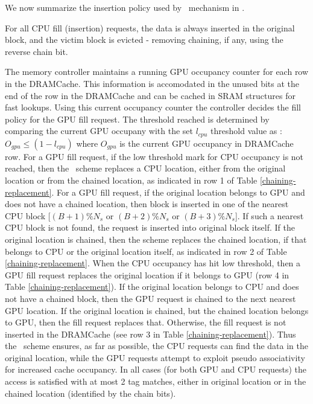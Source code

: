 \par We now summarize the insertion policy used by \chaining\ mechanism in \cachename. 
\par For all CPU fill (insertion) requests, the data is always inserted in the original block, and the victim block is evicted - removing chaining, if any, using the reverse chain bit. 
\par The memory controller maintains a running GPU occupancy counter for each row in the DRAMCache. This information is accomodated in the unused bits at the end of the row in the DRAMCache and can be cached in SRAM structures for fast lookups. Using this current occupancy counter the controller decides the fill policy for the GPU fill request. The threshold reached is determined by comparing the current GPU occupany with the set \textit{$l_{cpu}$} threshold value as : $O_{gpu}\le(1-l_{cpu})$ where $O_{gpu}$ is the current GPU occupancy in DRAMCache row. For a GPU fill request, if the low threshold mark for CPU occupancy is not reached, then the \chaining\ scheme replaces a CPU location, either from the original location or from the chained location, as indicated in row 1 of Table \ref{chaining-replacement}. For a GPU fill request, if the original location belongs to GPU and does not have a chained location, then block is inserted in one of the nearest CPU block [$(B+1)\%N_s$ or $(B+2)\%N_s$ or $(B+3)\%N_s$]. If such a nearest CPU block is not found, the request is inserted into original block itself. If the original location is chained, then the scheme replaces the chained location, if that belongs to CPU or the original location itself, as indicated in row 2 of Table \ref{chaining-replacement}. When the CPU occupancy has hit low threshold, then a GPU fill request replaces the original location if it belongs to GPU (row 4 in Table \ref{chaining-replacement}). If the original location belongs to CPU and does not have a chained block, then the GPU request is chained to the next nearest GPU location. If the original location is chained, but the chained location belongs to GPU, then the fill request replaces that. Otherwise, the fill request is not inserted in the DRAMCache (see row 3 in Table \ref{chaining-replacement}). Thus the \chaining\ scheme ensures, as far as possible, the CPU requests can find the data in the original location, while the GPU requests attempt to exploit pseudo associativity for increased cache occupancy. In all cases (for both GPU and CPU requests) the access is satisfied with at most 2 tag matches, either in original location or in the chained location (identified by the chain bits). 

